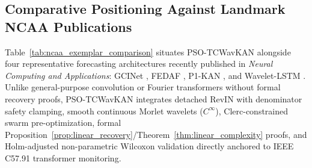 \documentclass[pdflatex,sn-mathphys-num,referee,lineno]{sn-jnl}
\theoremstyle{thmstyleone}
\theoremstyle{thmstyletwo}
\theoremstyle{thmstylethree}
\begin{document}
\begin{table}[htbp]
\centering
\caption{Verified hardware resource profile on NVIDIA Tesla T4 (PyTorch 2.11.0+cu130) across extreme horizon bounds.}
\label{tab:edge_profile}
\end{table}

\subsection{Comparative Positioning Against Landmark NCAA Publications}\label{subsec:exemplar_positioning}
Table~\ref{tab:ncaa_exemplar_comparison} situates PSO-TCWavKAN alongside four representative forecasting architectures recently published in \emph{Neural Computing and Applications}: GCINet \cite{fan2025gcinet}, FEDAF \cite{yang2024fedaf}, P1-KAN \cite{warin2026p1kan}, and Wavelet-LSTM \cite{tamilselvi2025waveletlstm}. Unlike general-purpose convolution or Fourier transformers without formal recovery proofs, PSO-TCWavKAN integrates detached RevIN with denominator safety clamping, smooth continuous Morlet wavelets ($C^\infty$), Clerc-constrained swarm pre-optimization, formal Proposition~\ref{prop:linear_recovery}/Theorem~\ref{thm:linear_complexity} proofs, and Holm-adjusted non-parametric Wilcoxon validation directly anchored to IEEE C57.91 transformer monitoring.
\end{document}

